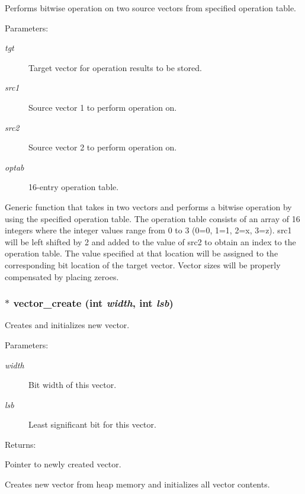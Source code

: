 Performs bitwise operation on two source vectors from specified operation table.

\begin{Desc}
\item[Parameters: ]\par
\begin{description}
\item[{\em 
tgt}]Target vector for operation results to be stored. \item[{\em 
src1}]Source vector 1 to perform operation on. \item[{\em 
src2}]Source vector 2 to perform operation on. \item[{\em 
optab}]16-entry operation table.\end{description}
\end{Desc}
Generic function that takes in two vectors and performs a bitwise operation by using the specified operation table. The operation table consists of an array of 16 integers where the integer values range from 0 to 3 (0=0, 1=1, 2=x, 3=z). src1 will be left shifted by 2 and added to the value of src2 to obtain an index to the operation table. The value specified at that location will be assigned to the corresponding bit location of the target vector. Vector sizes will be properly compensated by placing zeroes. 
\subsubsection{$\ast$ vector\_\-create (int {\em width}, int {\em lsb})}\label{vector_8c_a8}


Creates and initializes new vector.

\begin{Desc}
\item[Parameters: ]\par
\begin{description}
\item[{\em 
width}]Bit width of this vector. \item[{\em 
lsb}]Least significant bit for this vector. \end{description}
\end{Desc}
\begin{Desc}
\item[Returns: ]\par
Pointer to newly created vector.\end{Desc}
Creates new vector from heap memory and initializes all vector contents. 
